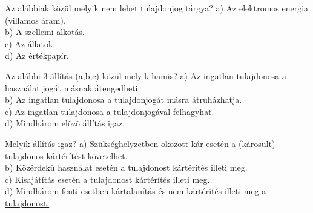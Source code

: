 \begin{frame}

\begin{tcolorbox}[title={115. Kérdés}]
Az alábbiak közül melyik nem lehet tulajdonjog tárgya?
\tcblower
a) Az elektromos energia (villamos áram).\\
\uline {b) A szellemi alkotás.}\\
c) Az állatok.\\
d) Az értékpapír.
\end{tcolorbox}

\begin{tcolorbox}[title={116. Kérdés}]
Az alábbi 3 állítás (a,b,c) közül melyik hamis?
\tcblower
a) Az ingatlan tulajdonosa a használat jogát másnak átengedheti.\\
b) Az ingatlan tulajdonosa a tulajdonjogát másra átruházhatja.\\
\uline {c) Az ingatlan tulajdonosa a tulajdonjogával felhagyhat.}\\
d) Mindhárom elõzõ állítás igaz.
\end{tcolorbox}

\begin{tcolorbox}[title={117. Kérdés}]
Melyik állítás igaz?
\tcblower
a) Szükséghelyzetben okozott kár esetén a (károsult) tulajdonos kártérítést követelhet.\\
b) Közérdekû használat esetén a tulajdonost kártérítés illeti meg.\\
c) Kisajátítás esetén a tulajdonost kártérítés illeti meg.\\
\uline {d) Mindhárom fenti esetben kártalanítás és nem kártérítés illeti meg a tulajdonost.}
\end{tcolorbox}

\end{frame}


